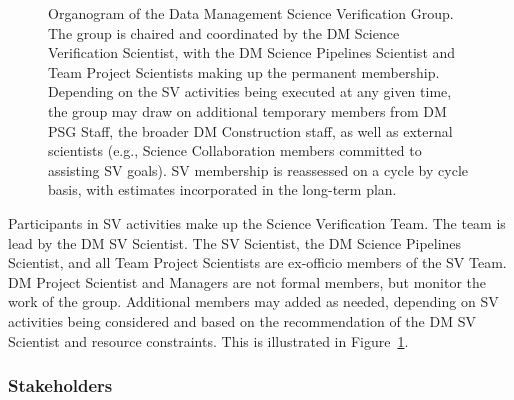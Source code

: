 \begin{figure}
\centering
{}
\caption{Organogram of the Data Management Science Verification Group. 
The group is chaired and coordinated by the DM Science Verification Scientist,
with the DM Science Pipelines Scientist and Team Project Scientists making up
the permanent membership. Depending on the SV activities being executed at any
given time, the group may draw on additional temporary members from DM PSG Staff,
the broader DM Construction staff, as well as external scientists (e.g.,
Science Collaboration members committed to assisting SV goals). SV membership
is reassessed on a cycle by cycle basis, with estimates incorporated in the
long-term plan.
\label{fig:DMsvg}}
\end{figure}

Participants in SV activities make up the Science Verification Team. 
The team is lead by the DM SV Scientist. The SV Scientist, the DM Science
Pipelines Scientist, and all Team Project Scientists are ex-officio members
of the SV Team. DM Project Scientist and Managers are not formal members,
but monitor the work of the group. Additional members may added as
needed, depending on SV activities being considered and based on the
recommendation of the DM SV Scientist and resource constraints. This is
illustrated in Figure~\ref{fig:DMsvg}.

\subsubsection{Stakeholders}

